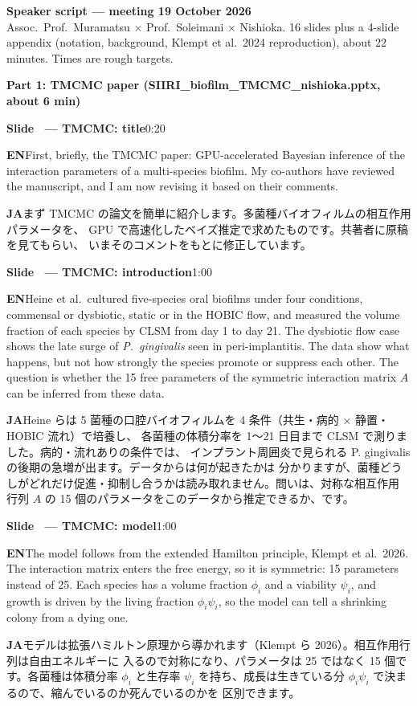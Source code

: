 \documentclass[11pt,a4paper]{article}
\newcounter{sl}
\newcommand{\slide}[2]{\stepcounter{sl}\vspace{8pt}%
  {\color{c3}\large\bfseries Slide \thesl\ --- #1}\hfill{\small #2}\par\vspace{2pt}}
\newcommand{\EN}{\textbf{EN}\quad}
\newcommand{\JA}{\par\textbf{JA}\quad}
\begin{document}
{\Large\bfseries Speaker script --- meeting 19 October 2026}\\[2pt]
Assoc.\ Prof.\ Muramatsu $\times$ Prof.\ Soleimani $\times$ Nishioka.
16 slides plus a 4-slide appendix (notation, background, Klempt et al.\ 2024 reproduction), about 22 minutes. Times are rough targets.

{\large\bfseries Part 1: TMCMC paper (SIIRI\_biofilm\_TMCMC\_nishioka.pptx, about 6 min)}\par

\slide{TMCMC: title}{0:20}
\EN First, briefly, the TMCMC paper: GPU-accelerated Bayesian inference of
the interaction parameters of a multi-species biofilm. My co-authors have
reviewed the manuscript, and I am now revising it based on their comments.
\JA まず TMCMC の論文を簡単に紹介します。多菌種バイオフィルムの相互作用パラメータを、
GPU で高速化したベイズ推定で求めたものです。共著者に原稿を見てもらい、
いまそのコメントをもとに修正しています。

\slide{TMCMC: introduction}{1:00}
\EN Heine et al.\ cultured five-species oral biofilms under four conditions,
commensal or dysbiotic, static or in the HOBIC flow, and measured the volume
fraction of each species by CLSM from day 1 to day 21. The dysbiotic flow
case shows the late surge of \textit{P.~gingivalis} seen in peri-implantitis.
The data show what happens, but not how strongly the species promote or
suppress each other. The question is whether the 15 free parameters of the
symmetric interaction matrix $A$ can be inferred from these data.
\JA Heine らは 5 菌種の口腔バイオフィルムを 4 条件（共生・病的 × 静置・HOBIC 流れ）で培養し、
各菌種の体積分率を 1〜21 日目まで CLSM で測りました。病的・流れありの条件では、
インプラント周囲炎で見られる P. gingivalis の後期の急増が出ます。データからは何が起きたかは
分かりますが、菌種どうしがどれだけ促進・抑制し合うかは読み取れません。問いは、対称な相互作用
行列 $A$ の 15 個のパラメータをこのデータから推定できるか、です。

\slide{TMCMC: model}{1:00}
\EN The model follows from the extended Hamilton principle, Klempt et al.\ 2026.
The interaction matrix enters the free energy, so it is symmetric: 15
parameters instead of 25. Each species has a volume fraction $\phi_i$ and a
viability $\psi_i$, and growth is driven by the living fraction $\phi_i\psi_i$,
so the model can tell a shrinking colony from a dying one.
\JA モデルは拡張ハミルトン原理から導かれます（Klempt ら 2026）。相互作用行列は自由エネルギーに
入るので対称になり、パラメータは 25 ではなく 15 個です。各菌種は体積分率 $\phi_i$ と生存率
$\psi_i$ を持ち、成長は生きている分 $\phi_i\psi_i$ で決まるので、縮んでいるのか死んでいるのかを
区別できます。
\end{document}
